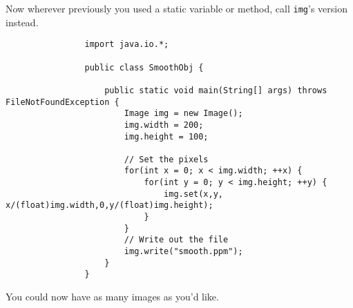 \documentclass{article}
\begin{document}
            Now wherever previously you used a static variable or method, call \texttt{img}'s version instead.     
            
            \begin{verbatim}
                import java.io.*;

                public class SmoothObj {

                    public static void main(String[] args) throws FileNotFoundException {
                        Image img = new Image();
                        img.width = 200;
                        img.height = 100;
                        
                        // Set the pixels
                        for(int x = 0; x < img.width; ++x) {
                            for(int y = 0; y < img.height; ++y) {
                                img.set(x,y, x/(float)img.width,0,y/(float)img.height);
                            }
                        }
                        // Write out the file
                        img.write("smooth.ppm");
                    }
                }
            \end{verbatim}
                    
            You could now have as many images as you'd like.
            
\end{document}
